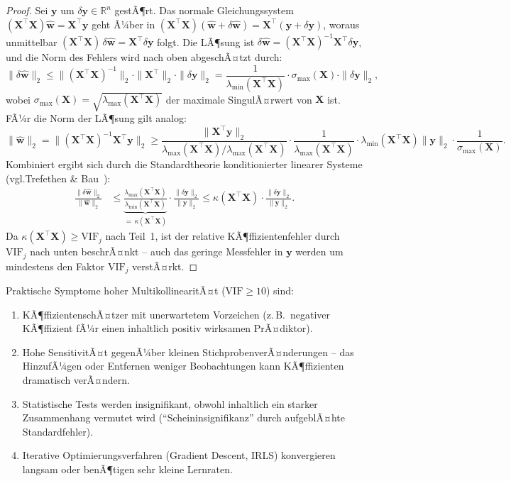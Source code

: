 ﻿\documentclass[12pt, a4paper]{article}
\theoremstyle{definition}
\theoremstyle{remark}
\newcommand{\R}{\mathbb{R}}
\newcommand{\vw}{\bm{w}}
\newcommand{\vy}{\bm{y}}
\newcommand{\vX}{\bm{X}}
\newcommand{\T}{\top}
\begin{document}
\begin{proof}
	Sei $\vy$ um $\delta\vy \in \R^n$ gestÃ¶rt. Das normale Gleichungssystem
	$(\vX^\T\vX)\hat{\vw} = \vX^\T\vy$ geht Ã¼ber in
	$(\vX^\T\vX)(\hat{\vw}+\delta\hat{\vw}) = \vX^\T(\vy+\delta\vy)$,
	woraus unmittelbar $(\vX^\T\vX)\,\delta\hat{\vw} = \vX^\T\delta\vy$ folgt. Die LÃ¶sung
	ist $\delta\hat{\vw} = (\vX^\T\vX)^{-1}\vX^\T\delta\vy$, und die Norm des Fehlers wird
	nach oben abgeschÃ¤tzt durch:
	\[
	\|\delta\hat{\vw}\|_2
	\leq \bigl\|(\vX^\T\vX)^{-1}\bigr\|_2 \cdot \|\vX^\T\|_2 \cdot \|\delta\vy\|_2
	= \frac{1}{\lambda_{\min}(\vX^\T\vX)} \cdot \sigma_{\max}(\vX) \cdot \|\delta\vy\|_2,
	\]
	wobei $\sigma_{\max}(\vX) = \sqrt{\lambda_{\max}(\vX^\T\vX)}$ der maximale SingulÃ¤rwert
	von $\vX$ ist. FÃ¼r die Norm der LÃ¶sung gilt analog:
	\[
	\|\hat{\vw}\|_2 = \bigl\|(\vX^\T\vX)^{-1}\vX^\T\vy\bigr\|_2
	\geq \frac{\|\vX^\T\vy\|_2}{\lambda_{\max}(\vX^\T\vX)/\lambda_{\max}(\vX^\T\vX)} \cdot \frac{1}{\lambda_{\max}(\vX^\T\vX)} \cdot \lambda_{\min}(\vX^\T\vX)\|\vy\|_2 \cdot \frac{1}{\sigma_{\max}(\vX)}.
	\]
	Kombiniert ergibt sich durch die Standardtheorie konditionierter linearer Systeme
	(vgl.\@ Trefethen \& Bau~\cite{trefethen1997numerical}):
	\begin{align*}
		\frac{\|\delta\hat{\vw}\|_2}{\|\hat{\vw}\|_2}
		&\leq \underbrace{\frac{\lambda_{\max}(\vX^\T\vX)}{\lambda_{\min}(\vX^\T\vX)}}_{=\,\kappa(\vX^\T\vX)}
		\cdot \frac{\|\delta\vy\|_2}{\|\vy\|_2}
		\leq \kappa(\vX^\T\vX) \cdot \frac{\|\delta\vy\|_2}{\|\vy\|_2}.
	\end{align*}
	Da $\kappa(\vX^\T\vX) \geq \mathrm{VIF}_j$ nach Teil~1, ist der relative
	KÃ¶ffizientenfehler durch $\mathrm{VIF}_j$ nach unten beschrÃ¤nkt -- auch das geringe
	Messfehler in $\vy$ werden um mindestens den Faktor $\mathrm{VIF}_j$ verstÃ¤rkt.
\end{proof}

Praktische Symptome hoher MultikollinearitÃ¤t ($\mathrm{VIF} \geq 10$) sind:
\begin{enumerate}[label=(\roman*)]
	\item KÃ¶ffizientenschÃ¤tzer mit unerwartetem Vorzeichen (z.\,B.\ negativer KÃ¶ffizient
	fÃ¼r einen inhaltlich positiv wirksamen PrÃ¤diktor).
	\item Hohe SensitivitÃ¤t gegenÃ¼ber kleinen StichprobenverÃ¤nderungen -- das HinzufÃ¼gen
	oder Entfernen weniger Beobachtungen kann KÃ¶ffizienten dramatisch verÃ¤ndern.
	\item Statistische Tests werden insignifikant, obwohl inhaltlich ein starker Zusammenhang
	vermutet wird (``Scheininsignifikanz'' durch aufgeblÃ¤hte Standardfehler).
	\item Iterative Optimierungsverfahren (Gradient Descent, IRLS) konvergieren langsam
	oder benÃ¶tigen sehr kleine Lernraten.
\end{enumerate}
\end{document}
